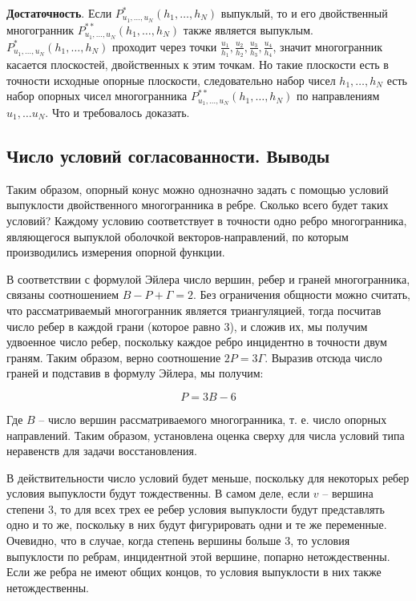 \documentclass[a4paper, 12pt, titlepage]{article}
\theoremstyle{definition}
\theoremstyle{plain}
\theoremstyle{plain}
\begin{document}
\textbf{Достаточность}. Если $P^{*}_{u_{1}, \ldots, u_{N}}(h_{1}, \ldots,
h_{N})$ выпуклый, то и его двойственный многогранник $P^{**}_{u_{1}, \ldots,
u_{N}}(h_{1}, \ldots, h_{N})$ также является выпуклым. $P^{*}_{u_{1}, \ldots,
u_{N}}(h_{1}, \ldots, h_{N})$ проходит через точки $\frac{u_{1}}{h_{1}},
\frac{u_{2}}{h_{2}},  \frac{u_{3}}{h_{3}}, \frac{u_{4}}{h_{4}}$, значит
многогранник касается плоскостей, двойственных к этим точкам. Но такие
плоскости есть в точности исходные опорные плоскости, следовательно набор
чисел $h_{1}, \ldots, h_{N}$ есть набор опорных чисел многогранника
$P^{**}_{u_{1}, \ldots, u_{N}}(h_{1}, \ldots, h_{N})$ по направлениям
$u_{1}, \ldots u_{N}$. Что и требовалось доказать.

\Square

\newpage
\subsection{Число условий согласованности. Выводы}
\label{sec:effictive-criterion:conclusions}

Таким образом, опорный конус можно однозначно задать с помощью условий
выпуклости двойственного многогранника в ребре. Сколько всего будет таких
условий? Каждому условию соответствует в точности одно ребро многогранника,
являющегося выпуклой оболочкой векторов-направлений, по которым производились
измерения опорной функции.

В соответствии с формулой Эйлера число вершин, ребер и граней
многогранника, связаны соотношением $B - P + \Gamma = 2$. Без ограничения
общности можно считать, что рассматриваемый многогранник является триангуляцией,
тогда посчитав число ребер в каждой грани (которое равно $3$), и сложив их, мы
получим удвоенное число ребер, поскольку каждое ребро инцидентно в точности
двум граням. Таким образом, верно соотношение $2 P = 3 \Gamma$. Выразив отсюда
число граней и подставив в формулу Эйлера, мы получим:

$$
 P = 3 B - 6
$$

Где $B$ -- число вершин рассматриваемого многогранника, т. е. число опорных
направлений. Таким образом, установлена оценка сверху для числа условий типа
неравенств для задачи восстановления.

В действительности число условий будет меньше, поскольку для некоторых ребер
условия выпуклости будут тождественны. В самом деле, если $v$ -- вершина
степени $3$, то для всех трех ее ребер условия выпуклости будут представлять
одно и то же, поскольку в них будут фигурировать одни и те же переменные.
Очевидно, что в случае, когда степень вершины больше $3$, то условия выпуклости
по ребрам, инцидентной этой вершине, попарно нетождественны. Если же ребра не
имеют общих концов, то условия выпуклости в них также нетождественны.
\end{document}
